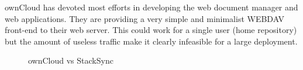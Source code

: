 ownCloud has devoted most efforts in developing the web document manager and web applications. They are providing a very simple and minimalist WEBDAV front-end  to their web server. This could work for a single user (home repository) but the amount of useless traffic make it clearly infeasible for a large deployment.

\begin{figure}[t]
  \centering
  \caption{ownCloud vs StackSync}
  \vspace{-5pt}
  \label{fig:owncloud}
\end{figure}